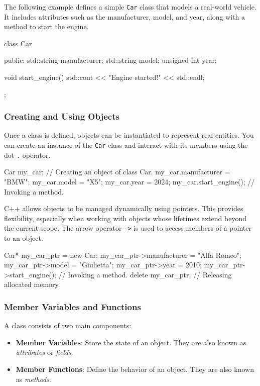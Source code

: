 The following example defines a simple \texttt{Car} class that models a real-world vehicle. It includes attributes such as the manufacturer, model, and year, along with a method to start the engine.
\begin{codeblock}[language=C++]
class Car {
public:
    std::string manufacturer;
    std::string model;
    unsigned int year;

    void start_engine() {
        std::cout << "Engine started!" << std::endl;
    }
};
\end{codeblock}

\subsubsection{Creating and Using Objects}

Once a class is defined, objects can be instantiated to represent real entities. You can create an instance of the \texttt{Car} class and interact with its members using the dot \texttt{.} operator.

\begin{codeblock}[language=C++, firstnumber=11]
Car my_car;                     // Creating an object of class Car.
my_car.manufacturer = "BMW";
my_car.model = "X5";
my_car.year = 2024;
my_car.start_engine();          // Invoking a method.
\end{codeblock}

C++ allows objects to be managed dynamically using pointers. This provides flexibility, especially when working with objects whose lifetimes extend beyond the current scope. The arrow operator \texttt{->} is used to access members of a pointer to an object.

\begin{codeblock}[language=C++, firstnumber=16]
Car* my_car_ptr = new Car{};
my_car_ptr->manufacturer = "Alfa Romeo";
my_car_ptr->model = "Giulietta";
my_car_ptr->year = 2010;
my_car_ptr->start_engine();     // Invoking a method.
delete my_car_ptr;              // Releasing allocated memory.
\end{codeblock}

\subsubsection{Member Variables and Functions}

A class consists of two main components:

\begin{itemize}
    \item \textbf{Member Variables}: Store the state of an object. They are also known as \textit{attributes} or \textit{fields}.
    \item \textbf{Member Functions}: Define the behavior of an object. They are also known as \textit{methods}.
\end{itemize}

